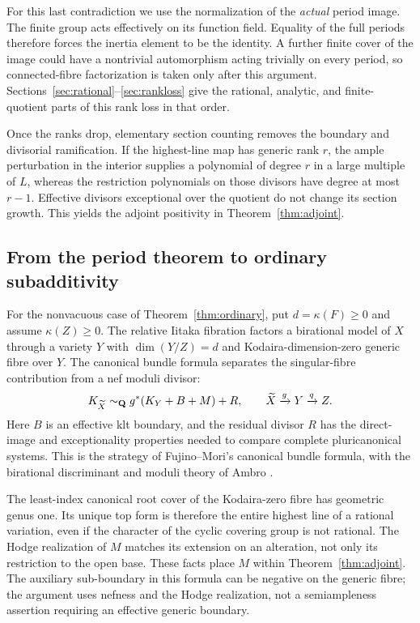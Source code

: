For this last contradiction we use the normalization of the
\emph{actual} period image. The finite group acts effectively on
its function field. Equality of the full periods therefore forces
the inertia element to be the identity. A further finite cover
of the image could have a nontrivial automorphism acting trivially
on every period, so connected-fibre factorization is taken only
after this argument. Sections~\ref{sec:rational}--\ref{sec:rankloss}
give the rational, analytic, and finite-quotient parts of this rank
loss in that order.

Once the ranks drop, elementary section counting removes the
boundary and divisorial ramification. If the highest-line map has
generic rank $r$, the ample
perturbation in the interior supplies a polynomial of degree $r$
in a large multiple of $L$, whereas the restriction polynomials
on those divisors have degree at most $r-1$. Effective divisors
exceptional over the quotient do not change its section growth.
This yields the adjoint positivity in Theorem~\ref{thm:adjoint}.

\subsection{From the period theorem to ordinary subadditivity}

For the nonvacuous case of Theorem~\ref{thm:ordinary}, put
$d=\kappa(F)\geq0$ and assume $\kappa(Z)\geq0$. The relative Iitaka
fibration factors a birational model of $X$ through a variety $Y$
with $\dim(Y/Z)=d$ and Kodaira-dimension-zero generic fibre over
$Y$. The canonical bundle formula separates the singular-fibre
contribution from a nef moduli divisor:
\[
 K_{\widetilde X}\sim_{\mathbf Q}
 g^*(K_Y+B+M)+R,\qquad \widetilde X\xrightarrow{g}Y\xrightarrow{q}Z.
\]
Here $B$ is an effective klt boundary, and the residual divisor $R$
has the direct-image and exceptionality properties needed to compare
complete pluricanonical systems. This is the strategy of
Fujino--Mori's canonical bundle formula, with the birational
discriminant and moduli theory of Ambro
\cite[Theorem~4.5]{FujinoMori}
\cite{AmbroBoundary,AmbroModuli}.

The least-index canonical root cover of the Kodaira-zero fibre
has geometric genus one. Its unique top form is therefore the
entire highest line of a rational variation, even if the character
of the cyclic covering group is not rational. The Hodge realization
of $M$ matches its extension on an alteration, not only its
restriction to the open base. These facts place $M$ within
Theorem~\ref{thm:adjoint}. The auxiliary sub-boundary in this formula
can be negative on the generic fibre; the argument uses nefness
and the Hodge realization, not a semiampleness assertion requiring
an effective generic boundary.


